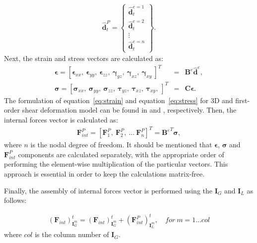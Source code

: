 \documentclass[11pt,a4paper,final]{report}
\begin{document}
\begin{eqnarray}
	\widehat{\textbf{d}}_t^P = \left\{ \begin{array}{c}
		\widehat{\textbf{d}}_t^{e=1}\\
		\widehat{\textbf{d}}_t^{e=2}\\
		\vdots\\
		\widehat{\textbf{d}}_t^{e=n} \end{array}\right\}.
\end{eqnarray}
Next, the strain and stress vectors are calculated as:
\begin{eqnarray}
	\label{eq:strain}
	\boldsymbol{\epsilon}=\left[\boldsymbol{\epsilon}_{xx},\ \boldsymbol{\epsilon}_{yy},\ \boldsymbol{\epsilon}_{zz},\ \boldsymbol{\gamma}_{yz},\ \boldsymbol{\gamma}_{xz},\ \boldsymbol{\gamma}_{xy}\ \right]^T&=&\textbf{B}^e\widehat{\textbf{d}}^e,\\
	\label{eq:stress}
	\boldsymbol{\sigma}=\left[\boldsymbol{\sigma}_{xx},\ \boldsymbol{\sigma}_{yy},\ \boldsymbol{\sigma}_{zz},\ \boldsymbol{\tau}_{yz},\ \boldsymbol{\tau}_{xz},\ \boldsymbol{\tau}_{xy},\ \right]^T&=&\textbf{C}\boldsymbol{\epsilon}.
\end{eqnarray}
The formulation of equation~\ref{eq:strain} and equation~\ref{eq:stress} for 3D and first-order shear deformation model can be found in \cite{kudela2016parallel} and \cite{kudela2020parallel}, respectively.
Then, the internal forces vector is calculated as:
\begin{eqnarray}
	\label{eq:forces}
	\textbf{F}^P_{int}=\left[\textbf{F}^P_1,\ \textbf{F}^P_2,\ \ldots\ \textbf{F}^P_{n} \right]^T={\textbf{B}^e}^T\boldsymbol{\sigma},
\end{eqnarray}
where $n$ is the nodal degree of freedom.
It should be mentioned that \(\boldsymbol{\epsilon}\), \(\boldsymbol{\sigma}\) and \(\textbf{F}^P_{int}\) components are calculated separately, with the appropriate order of performing the element-wise multiplication of the particular vectors.
This approach is essential in order to keep the calculations matrix-free.

Finally, the assembly of internal forces vector is performed using the \(\textbf{I}_G\) and \(\textbf{I}_L\) as follows:

\begin{eqnarray}
	\label{eq:Fint}
	{\left(\textbf{F}_{int}\right)}^t_{\textbf{I}^m_G} = {\left(\textbf{F}_{int}\right)}^t_{\textbf{I}^m_G} + {\left(\textbf{F}^P_{int}\right)}^t_{\textbf{I}^m_L},\quad for\ m=1\ldots col 
\end{eqnarray}
where \(col\) is the column number of \(\textbf{I}_G\).
\end{document}
